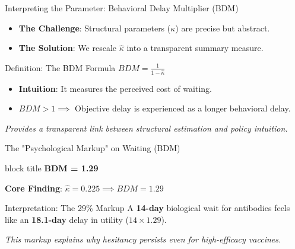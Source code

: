 \documentclass[10pt]{beamer}
\begin{document}
\begin{frame}{Interpreting the Parameter: Behavioral Delay Multiplier (BDM)}
    \begin{itemize}
        \item \textbf{The Challenge}: Structural parameters ($\kappa$) are precise but abstract.
        \item \textbf{The Solution}: We rescale $\hat{\kappa}$ into a transparent summary measure.
    \end{itemize}
    
    \begin{exampleblock}{Definition: The BDM Formula}
        \centering
        \large $BDM = \frac{1}{1 - \hat{\kappa}}$
    \end{exampleblock}
    
    \vspace{0.4cm}
    \begin{itemize}
        \item \textbf{Intuition}: It measures the \alert{perceived cost of waiting}. 
        \item $BDM > 1 \implies$ Objective delay is experienced as a longer behavioral delay.
    \end{itemize}
    \vfill
    \centering \scriptsize \textit{Provides a transparent link between structural estimation and policy intuition.}
\end{frame}

\begin{frame}{The "Psychological Markup" on Waiting (BDM)}
    \begin{center}
        \begin{beamercolorbox}[sep=1em, wd=0.6\textwidth, center]{block title}
            \Huge \alert{\textbf{BDM = 1.29}}
        \end{beamercolorbox}
    \end{center}
    
    \textbf{Core Finding}: $\hat{\kappa} = 0.225 \implies BDM = 1.29$
    \vspace{0.3cm}
    \begin{exampleblock}{Interpretation: The 29\% Markup}
        \small A \textbf{14-day} biological wait for antibodies feels like an \alert{\textbf{18.1-day}} delay in utility ($14 \times 1.29$).
    \end{exampleblock}
    \vfill
    \textit{This markup explains why hesitancy persists even for high-efficacy vaccines.}
\end{frame}
\end{document}
